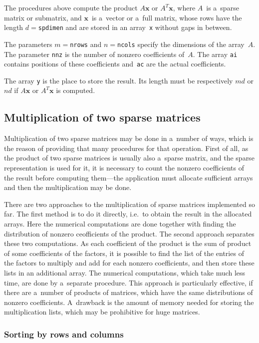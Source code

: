 The procedures above compute the product $A\bm{x}$ or $A^T\bm{x}$, where
$A$~is a~sparse matrix or submatrix, and $\bm{x}$~is a~vector or a~full
matrix, whose rows have the length $d=$\texttt{spdimen} and are stored in an
array~\texttt{x} without gaps in between.

The parameters $m=$\texttt{nrows} and $n=$\texttt{ncols} specify the dimensions
of the array~$A$. The parameter \texttt{nnz} is the number of nonzero
coefficients of~$A$. The array \texttt{ai} contains positions of these
coefficients and~\texttt{ac} are the actual coefficients.

The array \texttt{y} is the place to store the result. Its length must be
respectively $md$ or $nd$ if $A\bm{x}$ or $A^T\bm{x}$ is computed.


\subsection{\label{ssect:pknum:sparse:mult}Multiplication of two sparse matrices}

Multiplication of two sparse matrices may be done in a~number of ways, which
is the reason of providing that many procedures for that operation. First of
all, as the product of two sparse matrices is usually also a~sparse matrix,
and the sparse representation is used for it, it is necessary to count the
nonzero coefficients of the result before computing them---the application
must allocate sufficient arrays and then the multiplication may be done.

There are two approaches to the multiplication of sparse matrices
implemented so far. The first method is to do it directly, i.e.\ to obtain
the result in the allocated arrays. Here the numerical computations are done
together with finding the distribution of nonzero ceofficients of the
product. The second approach separates these two computations. As each
coefficient of the product is the sum of product of some coefficients of the
factors, it is possible to find the list of the entries of the factors to
multiply and add for each nonzero coefficients, and then store these lists
in an additional array. The numerical computations, which take much less
time, are done by a~separate procedure. This approach is particularly
effective, if there are a~number of products of matrices, which have the
same distributions of nonzero coefficients. A~drawback is the amount of
memory needed for storing the multiplication lists, which may be prohibitive
for huge matrices.


\subsubsection{Sorting by rows and columns}

